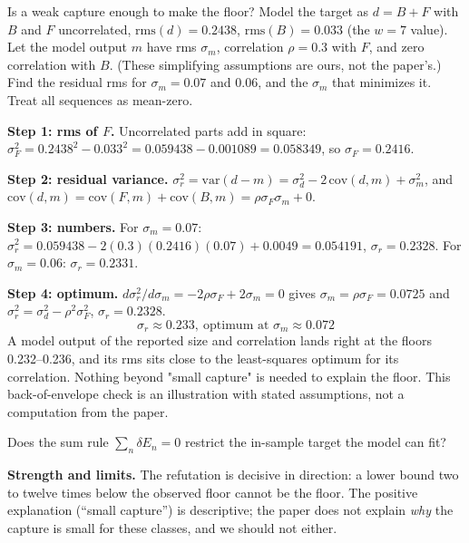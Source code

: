 \begin{sample}{Is a weak capture enough to make the floor?}
Model the target as $d=B+F$ with $B$ and $F$ uncorrelated, $\mathrm{rms}(d)=0.2438$, $\mathrm{rms}(B)=0.033$ (the $w=7$ value). Let the model output $m$ have rms $\sigma_m$, correlation $\rho=0.3$ with $F$, and zero correlation with $B$. (These simplifying assumptions are ours, not the paper's.) Find the residual rms for $\sigma_m=0.07$ and $0.06$, and the $\sigma_m$ that minimizes it. Treat all sequences as mean-zero.

\textbf{Step 1: rms of $F$.} Uncorrelated parts add in square: $\sigma_F^2=0.2438^2-0.033^2=0.059438-0.001089=0.058349$, so $\sigma_F=0.2416$.

\textbf{Step 2: residual variance.} $\sigma_r^2=\mathrm{var}(d-m)=\sigma_d^2-2\,\mathrm{cov}(d,m)+\sigma_m^2$, and $\mathrm{cov}(d,m)=\mathrm{cov}(F,m)+\mathrm{cov}(B,m)=\rho\sigma_F\sigma_m+0$.

\textbf{Step 3: numbers.} For $\sigma_m=0.07$: $\sigma_r^2=0.059438-2(0.3)(0.2416)(0.07)+0.0049=0.054191$, $\sigma_r=0.2328$. For $\sigma_m=0.06$: $\sigma_r=0.2331$.

\textbf{Step 4: optimum.} $d\sigma_r^2/d\sigma_m=-2\rho\sigma_F+2\sigma_m=0$ gives $\sigma_m=\rho\sigma_F=0.0725$ and $\sigma_r^2=\sigma_d^2-\rho^2\sigma_F^2$, $\sigma_r=0.2328$.
\[
\boxed{\sigma_r\approx0.233,\ \text{optimum at }\sigma_m\approx0.072}
\]
A model output of the reported size and correlation lands right at the floors 0.232--0.236, and its rms sits close to the least-squares optimum for its correlation. Nothing beyond "small capture" is needed to explain the floor. This back-of-envelope check is an illustration with stated assumptions, not a computation from the paper.
\end{sample}

\begin{checkpoint}
Does the sum rule $\sum_n\delta E_n=0$ restrict the in-sample target the model can fit?
\end{checkpoint}

\textbf{Strength and limits.} The refutation is decisive in direction: a lower bound two to twelve times below the observed floor cannot be the floor. The positive explanation (``small capture'') is descriptive; the paper does not explain \emph{why} the capture is small for these classes, and we should not either.

